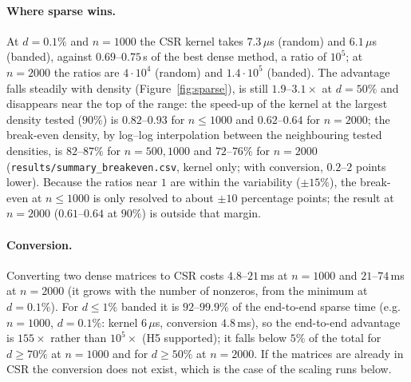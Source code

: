 \paragraph{Where sparse wins.} At $d=0.1\%$ and $n=1000$ the CSR kernel takes $7.3\,\mu$s (random) and $6.1\,\mu$s (banded), against $0.69$--$0.75$\,s of the best dense method, a ratio of $10^5$; at $n=2000$ the ratios are $4\cdot10^4$ (random) and $1.4\cdot10^5$ (banded).
The advantage falls steadily with density (Figure~\ref{fig:sparse}), is still $1.9$--$3.1\times$ at $d=50\%$ and disappears near the top of the range: the speed-up of the kernel at the largest density tested ($90\%$) is $0.82$--$0.93$ for $n\le1000$ and $0.62$--$0.64$ for $n=2000$; the break-even density, by log--log interpolation
between the neighbouring tested densities, is $82$--$87\%$ for $n=500,1000$ and $72$--$76\%$ for $n=2000$ (\texttt{results/summary\_breakeven.csv}, kernel only; with conversion, $0.2$--$2$ points lower). Because the ratios near $1$ are within the variability ($\pm15\%$), the break-even at $n\le1000$ is only
resolved to about $\pm10$ percentage points; the result at $n=2000$ ($0.61$--$0.64$ at $90\%$) is outside that margin.

\paragraph{Conversion.} Converting two dense matrices to CSR costs $4.8$--$21$\,ms at $n=1000$ and $21$--$74$\,ms at $n=2000$ (it grows with the number of nonzeros, from the minimum at $d=0.1\%$). For $d\le1\%$ banded it is $92$--$99.9\%$ of the end-to-end sparse time (e.g.\ $n=1000$, $d=0.1\%$: kernel $6\,\mu$s, conversion $4.8$\,ms), so the end-to-end advantage is $155\times$ rather than $10^5\times$ (H5 supported);
it falls below $5\%$ of the total for $d\ge70\%$ at $n=1000$ and for $d\ge50\%$ at $n=2000$. If the matrices are already in CSR the conversion does not exist, which is the case of the scaling runs below.

